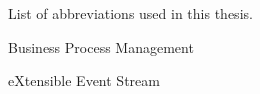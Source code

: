 %
%


List of abbreviations used in this thesis.

\begin{description}[CABR]
\item[BPM]{Business Process Management}
\item[XES]{eXtensible Event Stream}
\end{description}